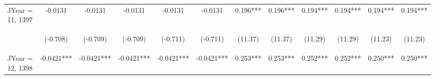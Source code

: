 \documentclass[]{article}
\begin{document}
\begin{center}
\begin{tabular}{lccccccccccc}
JYear = 11, 1397 & -0.0131 & -0.0131 & -0.0131 & -0.0131 & -0.0131 & 0.196*** & 0.196*** & 0.194*** & 0.194*** & 0.194*** & 0.194*** \\
\vspace{4pt} & \begin{footnotesize}(-0.708)\end{footnotesize} & \begin{footnotesize}(-0.709)\end{footnotesize} & \begin{footnotesize}(-0.709)\end{footnotesize} & \begin{footnotesize}(-0.711)\end{footnotesize} & \begin{footnotesize}(-0.711)\end{footnotesize} & \begin{footnotesize}(11.37)\end{footnotesize} & \begin{footnotesize}(11.37)\end{footnotesize} & \begin{footnotesize}(11.29)\end{footnotesize} & \begin{footnotesize}(11.29)\end{footnotesize} & \begin{footnotesize}(11.23)\end{footnotesize} & \begin{footnotesize}(11.23)\end{footnotesize} \\
JYear = 12, 1398 & -0.0421*** & -0.0421*** & -0.0421*** & -0.0421*** & -0.0421*** & 0.253*** & 0.253*** & 0.252*** & 0.252*** & 0.250*** & 0.250*** \\

\end{tabular}
\end{center}
\end{document}
